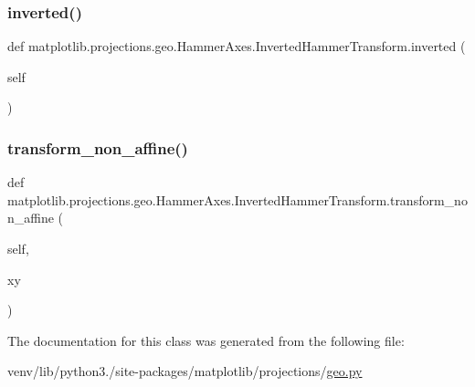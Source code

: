 \subsubsection{\texorpdfstring{inverted()}{inverted()}}
{\footnotesize\ttfamily def matplotlib.\+projections.\+geo.\+Hammer\+Axes.\+Inverted\+Hammer\+Transform.\+inverted (\begin{DoxyParamCaption}\item[{}]{self }\end{DoxyParamCaption})}

\mbox{\label{classmatplotlib_1_1projections_1_1geo_1_1HammerAxes_1_1InvertedHammerTransform_a97e6c402eb3469e7c7d5bf9b2e8be685}} 
\subsubsection{\texorpdfstring{transform\+\_\+non\+\_\+affine()}{transform\_non\_affine()}}
{\footnotesize\ttfamily def matplotlib.\+projections.\+geo.\+Hammer\+Axes.\+Inverted\+Hammer\+Transform.\+transform\+\_\+non\+\_\+affine (\begin{DoxyParamCaption}\item[{}]{self,  }\item[{}]{xy }\end{DoxyParamCaption})}



The documentation for this class was generated from the following file\+:\begin{DoxyCompactItemize}
\item 
venv/lib/python3./site-\/packages/matplotlib/projections/\hyperlink{geo_8py}{geo.\+py}\end{DoxyCompactItemize}

